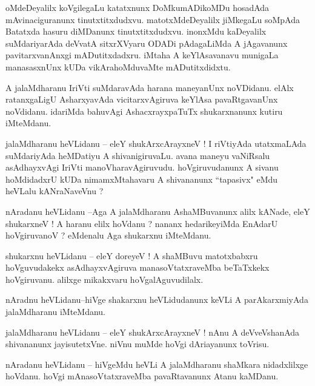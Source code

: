 \documentclass{article}
\begin{document}
\begin{mn}%
oMdeDeyalilx koVgilegaLu katatxnunx DoMkumADikoMDu hosadAda mAvinaciguranunx 
tinutxtitxdudxvu. matotxMdeDeyalilx jiMkegaLu soMpAda Batatxda hasuru diMDanunx 
tinutxtitxdudxvu. inonxMdu kaDeyalilx suMdariyarAda deVvatA sitxrXVyaru ODADi pAdagaLiMda A 
jAgavanunx pavitarxvanAnxgi mADutitxdadxru. iMtaha A keYlAsavanavu munigaLa manasasxnUnx 
kUDa vikArahoMduvaMte mADutitxdidxtu.
\end{mn}

\begin{mn}%
A jalaMdharanu IriVti suMdaravAda harana maneyanUnx noVDidanu. elAlx ratanxgaLigU 
AsharxyavAda vicitarxvAgiruva keYlAsa pavaRtgavanUnx noVdidanu. idariMda bahuvAgi 
AshacxrayxpaTuTx shukarxnanunx kutiru iMteMdanu.
\end{mn}

\begin{mn}%
jalaMdharanu heVLidanu -- eleY shukArxcArayxneV ! I riVtiyAda utatxmaLAda suMdariyAda 
heMDatiyu A shivanigiruvaLu. avana maneyu vaNiRsalu asAdhayxvAgi IriVti 
manoVharavAgiruvudu. hoVgiruvudanunx A sivanu hoMdidadxrU kUDa nimamxMtahavaru A shivananunx 
``tapasivx" eMdu heVLalu kANraNaveVnu ?
\end{mn}

\begin{mn}%
nAradanu heVLidanu --Aga A jalaMdharanu AshaMBuvanunx alilx kANade, eleY shukarxneV ! A 
haranu elilx hoVdanu ? nananx hedarikeyiMda EnAdarU hoVgiruvanoV ? eMdenalu Aga shukarxnu 
iMteMdanu.
\end{mn}

\begin{mn}%
shukarxnu heVLidanu -- eleY doreyeV ! A shaMBuvu matotxbabxru hoVguvudakekx asAdhayxvAgiruva 
manasoVtatxraveMba beTaTxkekx hoVgiruvanu. alilxge mikakxvaru hoVgalAguvudilalx.
\end{mn}

\begin{mn}%
nAradnu heVLidanu--hiVge shakarxnu heVLidudanunx keVLi A parAkarxmiyAda jalaMdharanu iMteMdanu.
\end{mn}

\begin{mn}%
jalaMdharanu heVLidanu -- eleY shukArxcArayxneV ! nAnu A deVveVshanAda shivananunx 
jayisutetxVne. niVnu muMde hoVgi dAriayanunx toVrisu.
\end{mn}

\begin{mn}%
nAradanu heVLidanu -- hiVgeMdu heVLi A jalaMdharanu shaMkara nidadxlilxge hoVdanu. hoVgi 
mAnasoVtatxraveMba pavaRtavanunx Atanu kaMDanu.
\end{mn}
\end{document}
